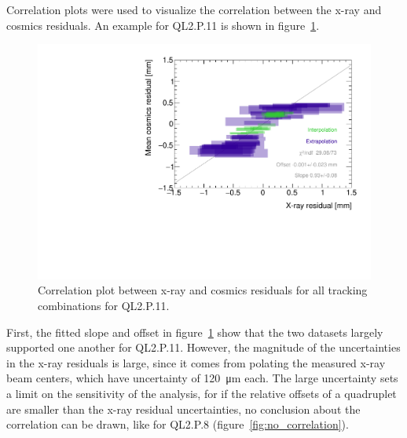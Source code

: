 Correlation plots were used to visualize the correlation between the x-ray and cosmics residuals. An example for QL2.P.11 is shown in figure~\ref{fig:correlation}.

\begin{figure}
    \centering
    \includegraphics[width = \textwidth]{figures/figure_QL2P11_3100V_2021-08-05_QL2P11_local_cosmic_and_xray_data_correlation_plot.pdf}
    \caption{Correlation plot between x-ray and cosmics residuals for all tracking combinations for QL2.P.11.}
    \label{fig:correlation}
\end{figure}

First, the fitted slope and offset in figure~\ref{fig:correlation} show that the two datasets largely supported one another for QL2.P.11. However, the magnitude of the uncertainties in the x-ray residuals is large, since it comes from polating the measured x-ray beam centers, which have uncertainty of \SI{120}{\micro\meter} each. The large uncertainty sets a limit on the sensitivity of the analysis, for if the relative offsets of a quadruplet are smaller than the x-ray residual uncertainties, no conclusion about the correlation can be drawn, like for QL2.P.8 (figure~\ref{fig:no_correlation}).

